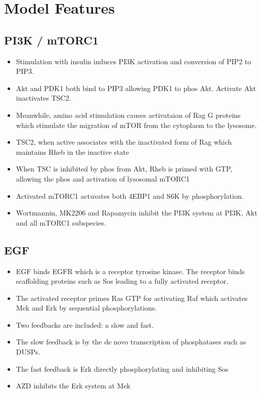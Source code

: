 \documentclass{article}
\begin{document}
    \section{Model Features}
    \subsection{PI3K / mTORC1}
    \begin{itemize}
        \item Stimulation with insulin induces PI3K activation and conversion of PIP2 to PIP3.
        \item Akt and PDK1 both bind to PIP3 allowing PDK1 to phos Akt. Activate Akt inactivates TSC2.
        \item Meanwhile, amino acid stimulation causes activataion of Rag G proteins which stimulate the migration of mTOR from the cytoplasm to the lysosome.
        \item TSC2, when active associates with the inactivated form of Rag which maintains Rheb in the inactive state
        \item When TSC is inhibited by phos from Akt, Rheb is primed with GTP, allowing the phos and activation of lysosomal mTORC1
        \item Activated mTORC1 actuvates both 4EBP1 and S6K by phosphorylation.
        \item Wortmannin, MK2206 and Rapamycin inhibit the PI3K system at PI3K, Akt and all mTORC1 subspecies.
    \end{itemize}

    \subsection{EGF}
    \begin{itemize}
        \item EGF binds EGFR which is a receptor tyrosine kinase. The receptor binds scaffolding proteins such as Sos leading to a fully activated receptor.
        \item The activated receptor primes Ras GTP for activating Raf which activates Mek and Erk by sequential phosphorylations.
        \item Two feedbacks are included: a slow and fast.
        \item The slow feedback is by the de novo transcription of phosphatases such as DUSPs.
        \item The fast feedback is Erk directly phosphorylating and inhibiting Sos
        \item AZD inhibits the Erk system at Mek
    \end{itemize}
\end{document}
